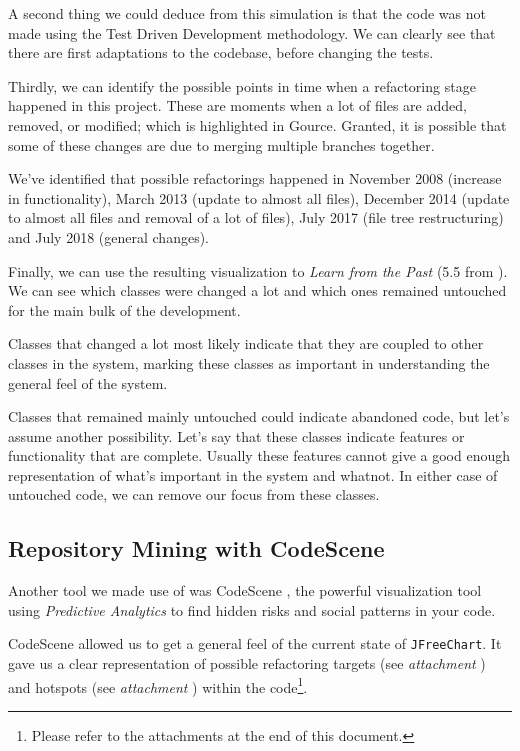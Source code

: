 \documentclass[11pt]{article}
\begin{document}
	A second thing we could deduce from this simulation is that the code was not made using the \textsf{Test Driven Development} methodology. We can clearly see that there are first adaptations to the codebase, before changing the tests.
	
	Thirdly, we can identify the possible points in time when a refactoring stage happened in this project. These are moments when a lot of files are added, removed, or modified; which is highlighted in \textsf{Gource}. Granted, it is possible that some of these changes are due to merging multiple branches together.
	
	We've identified that possible refactorings happened in November 2008 (increase in functionality), March 2013 (update to almost all files), December 2014 (update to almost all files and removal of a lot of files), July 2017 (file tree restructuring) and July 2018 (general changes).
	
	Finally, we can use the resulting visualization to \textsl{Learn from the Past} (5.5 from \cite{demeyer2009object}). We can see which classes were changed a lot and which ones remained untouched for the main bulk of the development.
	
	Classes that changed a lot most likely indicate that they are coupled to other classes in the system, marking these classes as important in understanding the general feel of the system.
	
	Classes that remained mainly untouched could indicate abandoned code, but let's assume another possibility. Let's say that these classes indicate features or functionality that are complete. Usually these features cannot give a good enough representation of what's important in the system and whatnot. In either case of untouched code, we can remove our focus from these classes.
	
	\subsection{Repository Mining with CodeScene}
	\label{sec:codescene}
	Another tool we made use of was \textsf{CodeScene} \cite{codescene}, the powerful visualization tool using \textit{Predictive Analytics} to find hidden risks and social patterns in your code.
	
	\textsf{CodeScene} allowed us to get a general feel of the current state of \texttt{JFreeChart}. It gave us a clear representation of possible refactoring targets (see \textsl{attachment \pageref{refactoring-overview}}) and hotspots (see \textsl{attachment \pageref{hotspots-overview}}) within the code\footnote{Please refer to the attachments at the end of this document.}.
	
\end{document}
